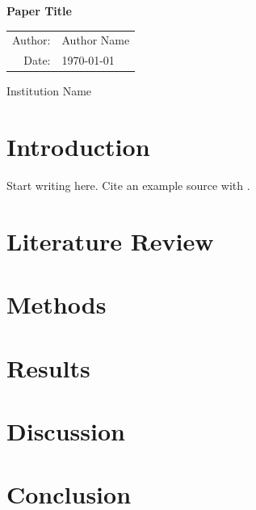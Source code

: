\documentclass[11pt]{article}
\newcommand{\proposalTitle}{Paper Title}
\newcommand{\authorName}{Author Name}
\newcommand{\dateSubmitted}{\today}
\begin{document}
\begin{titlepage}
\centering

\vspace*{3cm}

{\LARGE \bfseries \proposalTitle \par}

\vspace{1.5cm}

\begin{tabular}{rl}
Author: & \authorName \\
Date: & \dateSubmitted
\end{tabular}

\vfill
Institution Name
\end{titlepage}

\tableofcontents
\newpage

\section{Introduction}

Start writing here. Cite an example source with \parencite{example2026}.

\section{Literature Review}

\section{Methods}

\section{Results}

\section{Discussion}

\section{Conclusion}

\printbibliography
\end{document}
